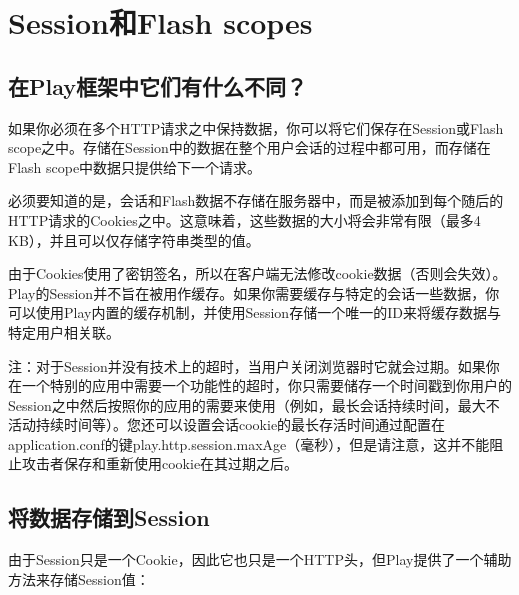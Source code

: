 \documentclass[letterpaper,10pt,english]{sphinxmanual}
\begin{document}
\section{Session和Flash scopes}
\label{\detokenize{index:sessionflash-scopes}}

\subsection{在Play框架中它们有什么不同？}
\label{\detokenize{index:id34}}
如果你必须在多个HTTP请求之中保持数据，你可以将它们保存在Session或Flash scope之中。存储在Session中的数据在整个用户会话的过程中都可用，而存储在Flash scope中数据只提供给下一个请求。

必须要知道的是，会话和Flash数据不存储在服务器中，而是被添加到每个随后的HTTP请求的Cookies之中。这意味着，这些数据的大小将会非常有限（最多4 KB），并且可以仅存储字符串类型的值。

由于Cookies使用了密钥签名，所以在客户端无法修改cookie数据（否则会失效）。Play的Session并不旨在被用作缓存。如果你需要缓存与特定的会话一些数据，你可以使用Play内置的缓存机制，并使用Session存储一个唯一的ID来将缓存数据与特定用户相关联。

注：对于Session并没有技术上的超时，当用户关闭浏览器时它就会过期。如果你在一个特别的应用中需要一个功能性的超时，你只需要储存一个时间戳到你用户的Session之中然后按照你的应用的需要来使用（例如，最长会话持续时间，最大不活动持续时间等）。您还可以设置会话cookie的最长存活时间通过配置在application.conf的键play.http.session.maxAge（毫秒），但是请注意，这并不能阻止攻击者保存和重新使用cookie在其过期之后。


\subsection{将数据存储到Session}
\label{\detokenize{index:session}}
由于Session只是一个Cookie，因此它也只是一个HTTP头，但Play提供了一个辅助方法来存储Session值：

\begin{sphinxVerbatim}[commandchars=\\\{\}]
   
     
     
\end{sphinxVerbatim}
\end{document}

